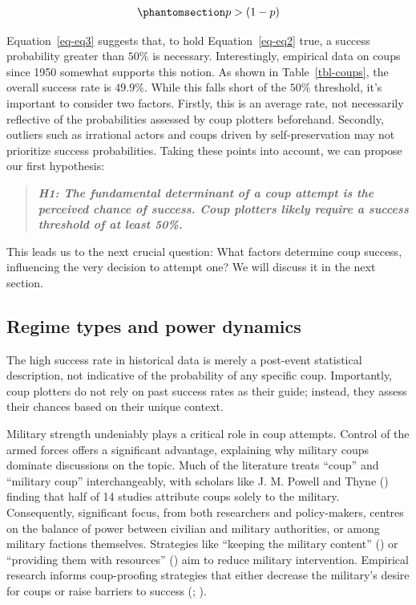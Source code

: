 \documentclass[
  12pt,
]{report}
\begin{document}
\begin{equation}\phantomsection\label{eq-eq3}{
\begin{aligned}
p > (1-p)
\end{aligned}
}\end{equation}

Equation~\ref{eq-eq3} suggests that, to hold Equation~\ref{eq-eq2} true,
a success probability greater than \(50\%\) is necessary. Interestingly,
empirical data on coups since 1950 somewhat supports this notion. As
shown in Table~\ref{tbl-coups}, the overall success rate is \(49.9\%\).
While this falls short of the \(50\%\) threshold, it's important to
consider two factors. Firstly, this is an average rate, not necessarily
reflective of the probabilities assessed by coup plotters beforehand.
Secondly, outliers such as irrational actors and coups driven by
self-preservation may not prioritize success probabilities. Taking these
points into account, we can propose our first hypothesis:

\begin{quote}
\textbf{\emph{H1: The fundamental determinant of a coup attempt is the
perceived chance of success. Coup plotters likely require a success
threshold of at least 50\%.}}
\end{quote}

This leads us to the next crucial question: What factors determine coup
success, influencing the very decision to attempt one? We will discuss
it in the next section.

\subsection{Regime types and power
dynamics}\label{regime-types-and-power-dynamics}

The high success rate in historical data is merely a post-event
statistical description, not indicative of the probability of any
specific coup. Importantly, coup plotters do not rely on past success
rates as their guide; instead, they assess their chances based on their
unique context.

Military strength undeniably plays a critical role in coup attempts.
Control of the armed forces offers a significant advantage, explaining
why military coups dominate discussions on the topic. Much of the
literature treats ``coup'' and ``military coup'' interchangeably, with
scholars like J. M. Powell and Thyne ()
finding that half of 14 studies attribute coups solely to the military.
Consequently, significant focus, from both researchers and
policy-makers, centres on the balance of power between civilian and
military authorities, or among military factions themselves. Strategies
like ``keeping the military content'' () or ``providing them with resources''
() aim to
reduce military intervention. Empirical research informs coup-proofing
strategies that either decrease the military's desire for coups or raise
barriers to success (;
).
\end{document}
